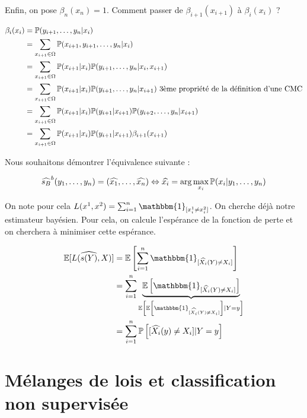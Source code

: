 Enfin, on pose $\beta_n(x_n) = 1$. Comment passer de $\beta_{i+1}(x_{i+1})$ à $\beta_i(x_i)$ ?

\renewcommand{\sumx}{\sum_{x_{i+1} \in \Omega}}
\begin{equation*}
\begin{split}
  \beta_{i}(x_{i}) &= \P(y_{i+1},\ldots,y_n\vert x_{i}) \\
  &= \sumx \P(x_{i+1}, y_{i+1},\ldots,y_n\vert x_{i}) \\
  &= \sumx \P(x_{i+1}\vert x_i)\P(y_{i+1},\ldots,y_n\vert x_{i}, x_{i+1}) \\
  &= \sumx \P(x_{i+1}\vert x_i)\P(y_{i+1},\ldots,y_n\vert x_{i+1}) \text{ 3ème propriété de la définition d'une CMC} \\
  &= \sumx \P(x_{i+1}\vert x_i) \P(y_{i+1} \vert x_{i+1}) \P(y_{i+2},\ldots,y_n\vert x_{i+1})  \\
  &= \sumx \P(x_{i+1}\vert x_i) \P(y_{i+1} \vert x_{i+1}) \beta_{i+1}(x_{i+1})
\end{split}
\end{equation*}

Nous souhaitons démontrer l'équivalence suivante :

\[ \widehat{s_B}^b(y_1,\ldots,y_n) = (\widehat{x_1}, \ldots, \widehat{x_n}) \Leftrightarrow \widehat{x_i} = \arg \max_{x_i} \P(x_i\vert y_1,\ldots,y_n) \]

On note pour cela $L(x^1, x^2) = \sum_{i=1}^n \mathbbm{1}_{[x_i^1 \neq x_i^2]}$. On cherche déjà notre estimateur bayésien. Pour cela, on calcule l'espérance de la fonction de perte et
on cherchera à minimiser cette espérance.

\begin{equation*}
\begin{split}
  \E[L(\widehat{s(Y)},X)] &= \E\left[ \sum_{i=1}^n \mathbbm{1}_{[\widehat{X_i}(Y) \neq X_i]} \right] \\
   &= \sum_{i=1}^n \underbrace{\E\left[ \mathbbm{1}_{[\widehat{X_i}(Y) \neq X_i]} \right]}_{\E\left[\E\left[ \mathbbm{1}_{[\widehat{X_i}(Y) \neq X_i]} \right]\vert Y=y \right]} \\
   &= \sum_{i=1}^n \P\left[ {[\widehat{X_i}(y) \neq X_i]} \vert Y=y \right] \\
\end{split}
\end{equation*}

\chapter{Mélanges de lois et classification non supervisée}

